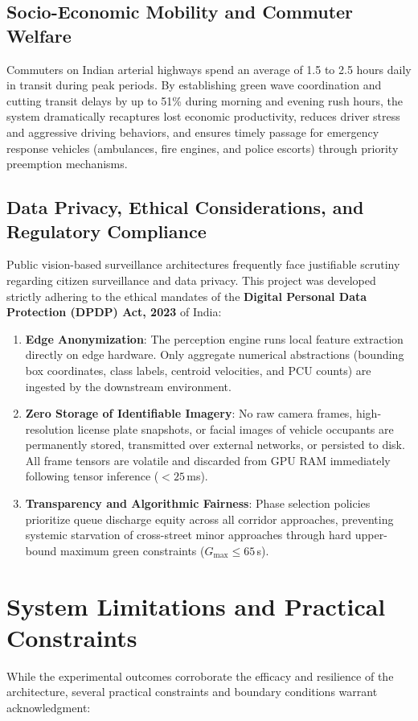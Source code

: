 \subsection{Socio-Economic Mobility and Commuter Welfare}
Commuters on Indian arterial highways spend an average of 1.5 to 2.5 hours daily in transit during peak periods. By establishing green wave coordination and cutting transit delays by up to 51\% during morning and evening rush hours, the system dramatically recaptures lost economic productivity, reduces driver stress and aggressive driving behaviors, and ensures timely passage for emergency response vehicles (ambulances, fire engines, and police escorts) through priority preemption mechanisms.

\subsection{Data Privacy, Ethical Considerations, and Regulatory Compliance}
Public vision-based surveillance architectures frequently face justifiable scrutiny regarding citizen surveillance and data privacy. This project was developed strictly adhering to the ethical mandates of the \textbf{Digital Personal Data Protection (DPDP) Act, 2023} of India:
\begin{enumerate}
    \item \textbf{Edge Anonymization}: The perception engine runs local feature extraction directly on edge hardware. Only aggregate numerical abstractions (bounding box coordinates, class labels, centroid velocities, and PCU counts) are ingested by the downstream environment.
    \item \textbf{Zero Storage of Identifiable Imagery}: No raw camera frames, high-resolution license plate snapshots, or facial images of vehicle occupants are permanently stored, transmitted over external networks, or persisted to disk. All frame tensors are volatile and discarded from GPU RAM immediately following tensor inference ($< 25$\,ms).
    \item \textbf{Transparency and Algorithmic Fairness}: Phase selection policies prioritize queue discharge equity across all corridor approaches, preventing systemic starvation of cross-street minor approaches through hard upper-bound maximum green constraints ($G_{\max} \le 65$\,s).
\end{enumerate}

\section{System Limitations and Practical Constraints}
\label{sec:limitations}
While the experimental outcomes corroborate the efficacy and resilience of the architecture, several practical constraints and boundary conditions warrant acknowledgment:

